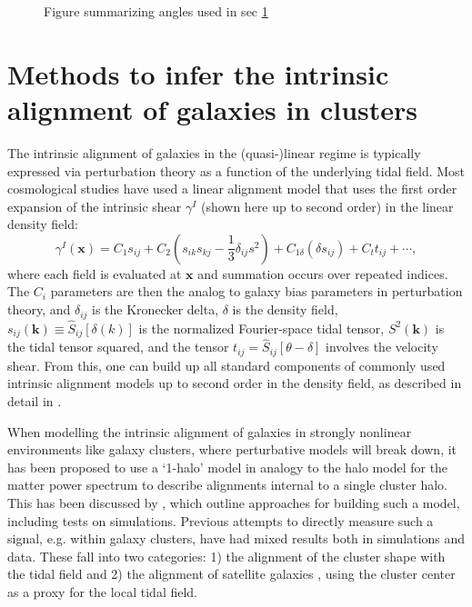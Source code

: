 \documentclass[fleqn,usenatbib]{mnras}
\begin{document}

\begin{figure}
\begin{center}
\end{center}
\caption[]{Figure summarizing angles used in sec \ref{methods}
\label{fig:phisat}}
\end{figure}

\section{Methods to infer the intrinsic alignment of galaxies in clusters}\label{methods}

The intrinsic alignment of galaxies in the (quasi-)linear regime is typically expressed via perturbation theory as a function of the underlying tidal field. Most cosmological studies have used a linear alignment model \cite{} that uses the first order expansion of the intrinsic shear $\gamma^I$ (shown here up to second order) in the linear density field:
\begin{equation}
    \gamma^I(\bm{x}) = C_1 s_{ij}+C_2\left(s_{ik}s_{kj}-\frac{1}{3}\delta_{ij}s^2\right)+C_{1\delta}(\delta s_{ij})+C_t t_{ij}+\cdots,
\end{equation}
where each field is evaluated at $\bm{x}$ and summation occurs over repeated indices. The $C_i$ parameters are then the analog to galaxy bias parameters in perturbation theory, and $\delta_{ij}$ is the Kronecker delta, $\delta$ is the density field, $s_{ij}(\bm{k})\equiv\hat{S}_{ij}[\delta(k)]$ is the normalized Fourier-space tidal tensor, $S^2(\bm{k})$ is the tidal tensor squared, and the tensor $t_{ij}=\hat{S}_{ij}[\theta-\delta]$ involves the velocity shear. From this, one can build up all standard components of commonly used intrinsic alignment models up to second order in the density field, as described in detail in \cite{blazek}.

When modelling the intrinsic alignment of galaxies in strongly nonlinear environments like galaxy clusters, where perturbative models will break down, it has been proposed to use a `1-halo' model in analogy to the halo model for the matter power spectrum to describe alignments internal to a single cluster halo. This has been discussed by \cite{SB10, 2003.02700}, which outline approaches for building such a model, including tests on simulations. Previous attempts to directly measure such a signal, e.g. within galaxy clusters, have had mixed results both in simulations and data. These fall into two categories: 1) the alignment of the cluster shape with the tidal field \cite{} and 2) the alignment of satellite galaxies \cite{}, using the cluster center as a proxy for the local tidal field. 
\end{document}
